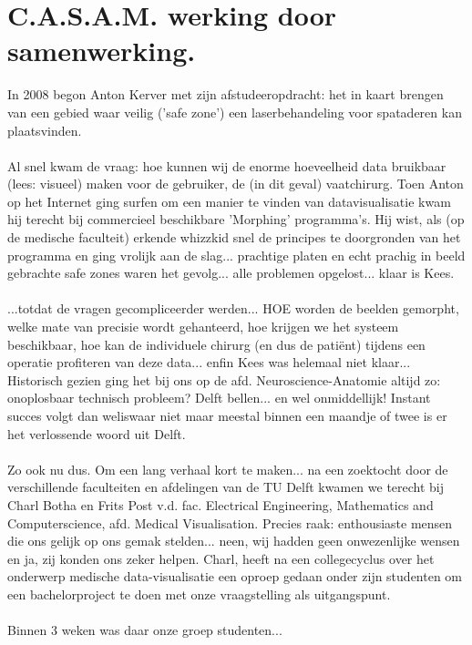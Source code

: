 
\section*{C.A.S.A.M. werking door samenwerking.}
In 2008 begon Anton Kerver met zijn afstudeeropdracht: het in kaart brengen van een gebied waar veilig ('safe zone') een laserbehandeling voor spataderen kan plaatsvinden.
\\
\\
Al snel kwam de vraag: hoe kunnen wij de enorme hoeveelheid data bruikbaar (lees: visueel) maken  voor de gebruiker, de (in dit geval) vaatchirurg. 
Toen Anton op het Internet ging surfen om een manier te vinden van datavisualisatie kwam hij terecht bij commercieel beschikbare 'Morphing' programma's. 
Hij wist, als (op de medische faculteit) erkende whizzkid snel de principes te doorgronden van het programma en ging vrolijk aan de slag... 
prachtige platen en echt prachig in beeld gebrachte safe zones waren het gevolg... 
alle problemen opgelost... klaar is Kees.
\\
\\
...totdat de vragen gecompliceerder werden... 
HOE worden de beelden gemorpht, welke mate van precisie wordt gehanteerd, hoe krijgen we het systeem beschikbaar, hoe kan de individuele chirurg (en dus de pati\"{e}nt) tijdens een operatie profiteren van deze data... enfin Kees was helemaal niet klaar...
Historisch gezien ging het bij ons op de afd. Neuroscience-Anatomie altijd zo: onoplosbaar technisch probleem? 
Delft bellen... en wel onmiddellijk! 
Instant succes volgt dan weliswaar niet maar meestal binnen een maandje of twee is er het verlossende woord uit Delft.
\\
\\
Zo ook nu dus. 
Om een lang verhaal kort te maken... 
na een zoektocht door de verschillende faculteiten en afdelingen van de TU Delft kwamen we terecht bij Charl Botha en Frits Post v.d. fac. Electrical Engineering, Mathematics and Computerscience,  afd. Medical Visualisation. 
Precies raak: enthousiaste mensen die ons gelijk op ons gemak stelden... 
neen, wij hadden geen onwezenlijke wensen en ja, zij konden ons zeker helpen. 
Charl, heeft na een collegecyclus over het onderwerp medische data-visualisatie een oproep gedaan onder zijn studenten om een bachelorproject te doen met onze vraagstelling als uitgangspunt.
\\
\\
Binnen 3 weken was daar onze groep studenten... 
